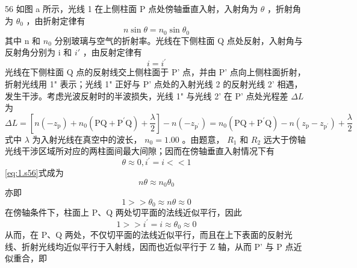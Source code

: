\begin{solution}{56}
    如图 a 所示，光线 1 在上侧柱面 P 点处傍轴垂直入射，入射角为 $\theta$ ，折射角为 $\theta_{0}$ ，由折射定律有
    \begin{equation}
        n \sin \theta = n _ {0} \sin \theta_{0}
        \label{eq:1.s56}
    \end{equation}
    其中 n 和 $n_{0}$ 分别玻璃与空气的折射率。光线在下侧柱面 Q 点处反射，入射角与反射角分别为 i 和 $i'$ ，由反射定律有
    \begin{equation}
        i = i^{\prime}
        \label{eq:2.s56}
    \end{equation}
    光线在下侧柱面 Q 点的反射线交上侧柱面于 P' 点，并由 P' 点向上侧柱面折射，折射光线用 1" 表示；光线 1" 正好与 P' 点处的入射光线 2 的反射光线 2' 相遇，发生干涉。考虑光波反射时的半波损失，光线 1" 与光线 2' 在 P' 点处光程差 $\Delta L$ 为
    \begin{equation}
        \Delta L = \left[ n \left(- z _ {\mathrm{p}}\right) + n _ {0} \left(\mathrm{PQ} + \mathrm{P}^{\prime}\mathrm{Q}\right) + \frac {\lambda}{2} \right] - n \left(- z _ {\mathrm{p}^{\prime}}\right) = n _ {0} \left(\mathrm{PQ} + \mathrm{P}^{\prime}\mathrm{Q}\right) - n \left(z _ {\mathrm{p}} - z _ {\mathrm{p}^{\prime}}\right) + \frac {\lambda}{2}
        \label{eq:3.s56}
    \end{equation}
    式中 $\lambda$ 为入射光线在真空中的波长， $n_{0}=1.00$ 。由题意， $R_{1}$ 和 $R_{2}$ 远大于傍轴光线干涉区域所对应的两柱面间最大间隙；因而在傍轴垂直入射情况下有
    \begin{equation}
        \theta \approx 0, i^{\prime} = i << 1
        \label{eq:4.s56}
    \end{equation}
    \eqref{eq:1.s56}式成为
    \begin{equation}
        n \theta \approx n _ {0} \theta_{0}
        \label{eq:5.s56}
    \end{equation}
    亦即
    \begin{equation}
        1 >> \theta_{0} \approx n \theta \approx 0
        \label{eq:6.s56}
    \end{equation}
    在傍轴条件下，柱面上 P、Q 两处切平面的法线近似平行，因此
    \begin{equation}
        1 >> i^{\prime} = i \approx \theta_{0} \approx 0
        \label{eq:7.s56}
    \end{equation}
    从而，在 P、Q 两处，不仅切平面的法线近似平行，而且在上下表面的反射光线、折射光线均近似平行于入射线，因而也近似平行于 Z 轴，从而 P' 与 P 点近似重合，即
    \begin{equation}

\end{equation}
\end{solution}
